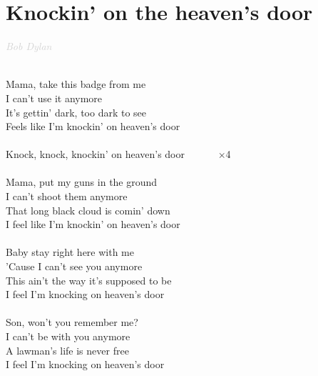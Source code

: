 \documentclass[a5paper, 10pt]{book}
\begin{document}


\newpage
\section{Knockin' on the heaven's door}\textcolor{lightgray}{\textit{Bob Dylan}}\\~\\
\begin{minipage}[t]{0.7\textwidth}
  Mama, take this badge from me				\\
  I can't use it anymore		\\
  It's gettin' dark, too dark to see\\
  Feels like I'm knockin' on heaven's door\\
  \\
  \hspace*{5mm}Knock, knock, knockin' on heaven's door ~~~~~~$\times$4\\
  \\
  Mama, put my guns in the ground\\
  I can't shoot them anymore\\
  That long black cloud is comin' down\\
  I feel like I'm knockin' on heaven's door\\
  \\
  Baby stay right here with me\\
  'Cause I can't see you anymore\\
  This ain't the way it's supposed to be\\
  I feel I'm knocking on heaven's door\\
  \\
  Son, won't you remember me?\\
  I can't be with you anymore\\
  A lawman's life is never free\\
  I feel I'm knocking on heaven's door\\
\end{minipage}
\end{document}
